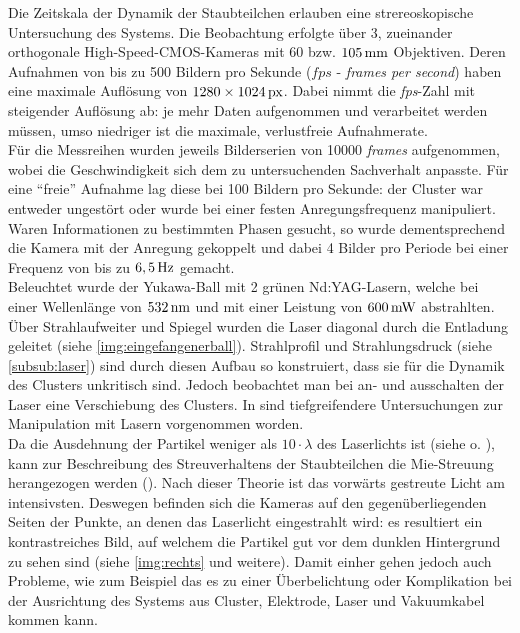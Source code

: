 \documentclass[numbers=noenddot,a4paper,notitlepage,twoside,BCOR15mm]{scrbook}
\newcommand{\tilt}[1]{\textit{#1}}
\begin{document}
			Die Zeitskala der Dynamik der Staubteilchen erlauben eine strereoskopische Untersuchung des Systems. Die Beobachtung erfolgte \"uber 3, zueinander orthogonale High-Speed-CMOS-Kameras mit 60 bzw. $\unit[105]{mm}$ Objektiven. Deren Aufnahmen von bis zu 500 Bildern pro Sekunde ($\unit{fps}$ - \tilt{frames per second}) haben eine maximale Aufl\"osung von $\unit[1280\times1024]{px}$. Dabei nimmt die \tilt{fps}-Zahl mit steigender Auflösung ab: je mehr Daten aufgenommen und verarbeitet werden müssen, umso niedriger ist die maximale, verlustfreie Aufnahmerate.\\
			Für die Messreihen wurden jeweils Bilderserien von 10000 \tilt{frames} aufgenommen, wobei die Geschwindigkeit sich dem zu untersuchenden Sachverhalt anpasste. F\"ur eine "`freie"' Aufnahme lag diese bei 100 Bildern pro Sekunde: der Cluster war entweder ungest\"ort oder wurde bei einer festen Anregungsfrequenz manipuliert. Waren Informationen zu bestimmten Phasen gesucht, so wurde dementsprechend die Kamera mit der Anregung gekoppelt und dabei 4 Bilder pro Periode bei einer Frequenz von bis zu $\unit[6,5]{Hz}$ gemacht. \\
			Beleuchtet wurde der Yukawa-Ball mit 2 gr\"unen Nd:YAG-Lasern, welche bei einer Wellenl\"ange von $\unit[532]{nm}$ und mit einer Leistung von $\unit[600]{mW}$ abstrahlten. Über Strahlaufweiter und Spiegel wurden die Laser diagonal durch die Entladung geleitet (siehe \autoref{img:eingefangenerball}). Strahlprofil und Strahlungsdruck (siehe \ref{subsub:laser}) sind durch diesen Aufbau so konstruiert, dass sie f\"ur die Dynamik des Clusters unkritisch sind. Jedoch beobachtet man bei an- und ausschalten der Laser eine Verschiebung des Clusters. In \cite{Mulsow13} sind tiefgreifendere Untersuchungen zur Manipulation mit Lasern vorgenommen worden.\\
			Da die Ausdehnung der Partikel weniger als $10\cdot\lambda$ des Laserlichts ist (siehe \cite{Mie08} o. \cite{Hulst81}), kann zur Beschreibung des Streuverhaltens der Staubteilchen die Mie-Streuung herangezogen werden (\cite{Bonitz10}). Nach dieser Theorie ist das vorw\"arts gestreute Licht am intensivsten. Deswegen befinden sich die Kameras auf den gegen\"uberliegenden Seiten der Punkte, an denen das Laserlicht eingestrahlt wird: es resultiert ein kontrastreiches Bild, auf welchem die Partikel gut vor dem dunklen Hintergrund zu sehen sind (siehe \autoref{img:rechts} und weitere). Damit einher gehen jedoch auch Probleme, wie zum Beispiel das es zu einer \"Uberbelichtung oder Komplikation bei der Ausrichtung des Systems aus Cluster, Elektrode, Laser und Vakuumkabel kommen kann.
\end{document}
